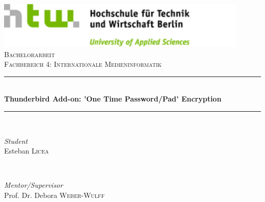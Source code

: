 \documentclass[12pt,a4paper]{article}
\begin{document}

\begin{titlepage} %
	\newcommand{\HRule}{\rule{\linewidth}{0.5mm}} %
	
	\center %
	
	
		\includegraphics[width=0.9\textwidth]{logo.png}\\[1cm] %
	
	\textsc{\Large Bachelorarbeit}\\[0.5cm] %
	
	\textsc{\large Fachbereich 4: Internationale Medieninformatik}\\[0.5cm] %
	
	
	\HRule\\[0.4cm]
	
	{\huge\bfseries Thunderbird Add-on: 'One Time Password/Pad' Encryption}\\[0.4cm] %
	
	\HRule\\[1.5cm]
	
	
	\begin{minipage}{0.4\textwidth}
		\begin{flushleft}
			\large
			\textit{Student}\\
			Esteban \textsc{Licea} %
		\end{flushleft}
	\end{minipage}
	~
	\begin{minipage}{0.4\textwidth}
		\begin{flushright}
			\large
			\textit{Mentor/Supervisor}\\
			Prof. Dr. Debora \textsc{Weber-Wulff} %
		\end{flushright}
	\end{minipage}
	

\end{titlepage}
\end{document}
